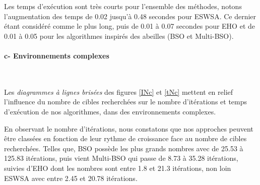 	Les temps d'exécution sont très courts pour l'ensemble des méthodes, notons l'augmentation des temps de 0.02 jusqu'à 0.48 secondes pour ESWSA. Ce dernier étant considéré comme le plus long, puis de 0.01 à 0.07 secondes pour EHO et de 0.01 à 0.05 pour les algorithmes inspirés des abeilles (BSO et Multi-BSO). 
	
	
	\noindent
	\hspace{-0.5cm}
	\begin{minipage}[t]{0.55\textwidth}
		\captionsetup{width=0.8\linewidth}
		\centering{}
		\label{INo}
	\end{minipage}\hfill
	\begin{minipage}[t]{0.55\textwidth}
		\captionsetup{width=0.8\linewidth}
		\centering{}
		\label{tNo}
	\end{minipage}\hfill
	
	
	
	
	
	\paragraph{c- Environnements complexes}
	\textbf{ }\\
	\noindent
	
	Les \textit{diagrammes à lignes brisées} des figures \ref{INc} et \ref{tNc} mettent en relief l'influence du nombre de cibles recherchées sur le nombre d'itérations et temps d'exécution de nos algorithmes, dans des environnements complexes.\\
	\vspace{-0.2cm}
	
	En observant le nombre d’itérations, nous constatons que nos approches peuvent être classées en fonction de leur rythme de croissance face au nombre de cibles recherchées. Telles que, BSO possède les plus grands nombres avec de 25.53 à 125.83 itérations, puis vient Multi-BSO qui passe de 8.73 à 35.28 itérations, suivies d'EHO dont les nombres sont entre 1.8 et 21.3 itérations, non loin ESWSA avec entre 2.45 et 20.78 itérations.\\
	\vspace{-0.2cm}
	
